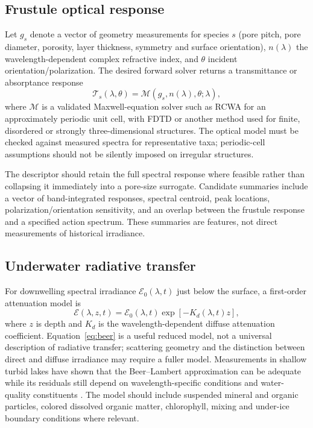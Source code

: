\documentclass[11pt,a4paper]{article}
\newcommand{\E}{\mathcal{E}}
\newcommand{\Tfr}{\mathcal{T}}
\begin{document}
\subsection{Frustule optical response}
Let $g_s$ denote a vector of geometry measurements for species $s$ (pore pitch, pore diameter, porosity, layer thickness, symmetry and surface orientation), $n(\lambda)$ the wavelength-dependent complex refractive index, and $\theta$ incident orientation/polarization. The desired forward solver returns a transmittance or absorptance response
\begin{equation}
\Tfr_s(\lambda,\theta)=\mathcal{M}\!\left(g_s,n(\lambda),\theta;\lambda\right),
\label{eq:forward}
\end{equation}
where $\mathcal{M}$ is a validated Maxwell-equation solver such as RCWA for an approximately periodic unit cell, with FDTD or another method used for finite, disordered or strongly three-dimensional structures. The optical model must be checked against measured spectra for representative taxa; periodic-cell assumptions should not be silently imposed on irregular structures.

The descriptor should retain the full spectral response where feasible rather than collapsing it immediately into a pore-size surrogate. Candidate summaries include a vector of band-integrated responses, spectral centroid, peak locations, polarization/orientation sensitivity, and an overlap between the frustule response and a specified action spectrum. These summaries are features, not direct measurements of historical irradiance.

\subsection{Underwater radiative transfer}
For downwelling spectral irradiance $\E_0(\lambda,t)$ just below the surface, a first-order attenuation model is
\begin{equation}
\E(\lambda,z,t)=\E_0(\lambda,t)\exp\!\left[-K_d(\lambda,t)z\right],
\label{eq:beer}
\end{equation}
where $z$ is depth and $K_d$ is the wavelength-dependent diffuse attenuation coefficient. Equation~\eqref{eq:beer} is a useful reduced model, not a universal description of radiative transfer; scattering geometry and the distinction between direct and diffuse irradiance may require a fuller model. Measurements in shallow turbid lakes have shown that the Beer--Lambert approximation can be adequate while its residuals still depend on wavelength-specific conditions and water-quality constituents \citep{weiskerger2018}. The model should include suspended mineral and organic particles, colored dissolved organic matter, chlorophyll, mixing and under-ice boundary conditions where relevant.
\end{document}
